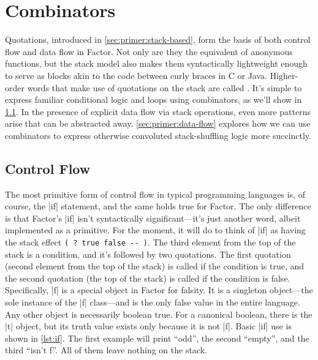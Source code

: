 \section{Combinators}\label{sec:primer:combinators}

Quotations, introduced in \cref{sec:primer:stack-based}, form the basis of both
control flow and data flow in Factor.  Not only are they the equivalent of
anonymous functions, but the stack model also makes them syntactically
lightweight enough to serve as blocks akin to the code between curly braces in
C or Java.  Higher-order words that make use of quotations on the stack are
called .  It's simple to express familiar conditional logic
and loops using combinators, as we'll show in \cref{sec:primer:control-flow}.
In the presence of explicit data flow via stack operations, even more patterns
arise that can be abstracted away.  \cref{sec:primer:data-flow} explores how we
can use combinators to express otherwise convoluted stack-shuffling logic more
succinctly.

\subsection{Control Flow}\label{sec:primer:control-flow}


The most primitive form of control flow in typical programming languages is, of
course, the |if| statement, and the same holds true for Factor.  The
only difference is that Factor's \factor|if| isn't syntactically
significant---it's just another word, albeit implemented as a primitive.  For
the moment, it will do to think of \factor|if| as having the stack effect
%
\Verb|( ? true false -- )|.
%
The third element from the top of the stack is a condition, and it's followed
by two quotations.  The first quotation (second element from the top of the
stack) is called if the condition is true, and the second quotation (the top of
the stack) is called if the condition is false.  Specifically, \factor|f| is a
special object in Factor for falsity.  It is a singleton object---the sole
instance of the \factor|f| class---and is the only false value in the entire
language.  Any other object is necessarily boolean true.  For a canonical
boolean, there is the \factor|t| object, but its truth value exists only
because it is not \factor|f|.  Basic \factor|if| use is shown in \cref{lst:if}.
The first example will print ``odd'', the second ``empty'', and the third
``isn't f''.  All of them leave nothing on the stack.

